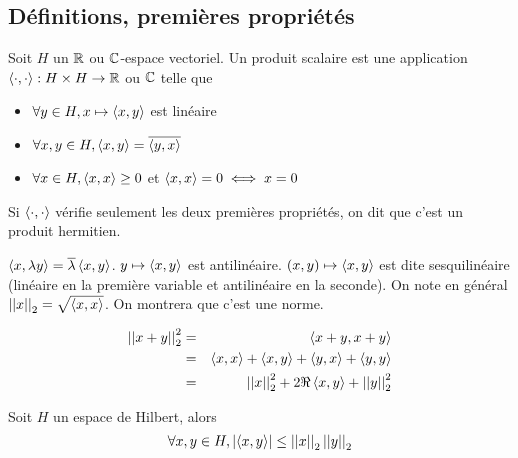 \subsection{Définitions, premières propriétés}

\begin{definition}
	Soit $H$ un $\mathbb{R}$ ou $\mathbb{C}$-espace vectoriel.
	Un produit scalaire est une application $\left\langle \cdot, \cdot \right\rangle : H \times H \to \mathbb{R}$ ou $\mathbb{C}$ telle que
	\begin{itemize}
		\item $\forall y \in H, x \mapsto \left\langle x, y \right\rangle$ est linéaire
		\item $\forall x,y \in H, \left\langle x, y \right\rangle = \overline{\left\langle y, x \right\rangle}$
		\item $\forall x \in H, \left\langle x, x \right\rangle \geq 0$ et $\left\langle x, x \right\rangle = 0 \iff x = 0$
	\end{itemize}

	Si $\left\langle \cdot, \cdot \right\rangle$ vérifie seulement les deux premières propriétés, on dit que c'est un produit hermitien.
\end{definition}

\begin{remarque}
	$\left\langle x, \lambda y \right\rangle = \overline{\lambda} \left\langle x, y \right\rangle $.
	$y \mapsto \left\langle x, y \right\rangle$ est antilinéaire.
	$(x,y) \mapsto \left\langle x, y \right\rangle$ est dite sesquilinéaire (linéaire en la première variable et antilinéaire en la seconde).
	On note en général $\left|\left|x\right|\right|_2 = \sqrt{\left\langle x, x \right\rangle}$. On montrera que c'est une norme.
\end{remarque}

\begin{remarque}
	\begin{eqnarray*}
		\left|\left|x + y\right|\right|_2^2 &=& \left\langle x + y, x + y \right\rangle\\
		&=& \left\langle x, x \right\rangle + \left\langle x, y \right\rangle + \left\langle y, x \right\rangle + \left\langle y, y \right\rangle\\
		&=& \left|\left|x\right|\right|_2^2 + 2\Re \left\langle x, y \right\rangle + \left|\left|y\right|\right|_2^2
	\end{eqnarray*}
\end{remarque}

\begin{prop}
	Soit $H$ un espace de Hilbert, alors
	$$ \forall x,y \in H, \left|\left\langle x, y \right\rangle\right| \leq \left|\left|x\right|\right|_2 \left|\left|y\right|\right|_2 $$
\end{prop}

